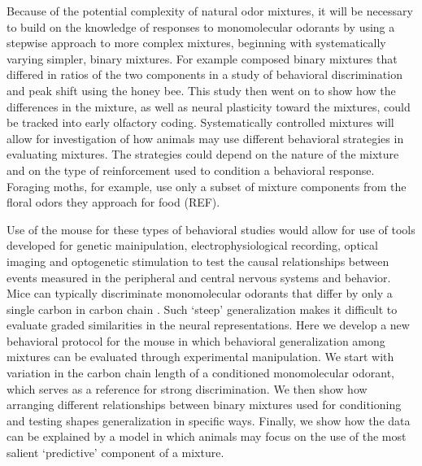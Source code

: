 Because of the potential complexity of natural odor mixtures, it will be necessary to build on the knowledge of responses to monomolecular odorants by using a stepwise approach to more complex mixtures, beginning with systematically varying simpler, binary mixtures. 
For example \cite{19692594} composed binary mixtures that differed in ratios of the two components in a study of behavioral discrimination and peak shift using the honey bee. 
This study then went on to show how the differences in the mixture, as well as neural plasticity toward the mixtures, could be tracked into early olfactory coding. 
Systematically controlled mixtures will allow for investigation of how animals may use different behavioral strategies in evaluating mixtures. 
The strategies could depend on the nature of the mixture and on the type of reinforcement used to condition a behavioral response. 
Foraging moths, for example, use only a subset of mixture components from the floral odors they approach for food (REF). 

Use of the mouse for these types of behavioral studies would allow for use of tools developed for genetic mainipulation, electrophysiological recording, optical imaging and optogenetic stimulation to test the causal relationships between events measured in the peripheral and central nervous systems and behavior. 
Mice can typically discriminate monomolecular odorants that differ by only a single carbon in carbon chain \cite{18810459}. 
Such ‘steep’ generalization makes it difficult to evaluate graded similarities in the neural representations. 
Here we develop a new behavioral protocol for the mouse in which behavioral generalization among mixtures can be evaluated through experimental manipulation. 
We start with variation in the carbon chain length of a conditioned monomolecular odorant, which serves as a reference for strong discrimination. 
We then show how arranging different relationships between binary mixtures used for conditioning and testing shapes generalization in specific ways. 
Finally, we show how the data can be explained by a model in which animals may focus on the use of the most salient ‘predictive’ component of a mixture. 
  
  